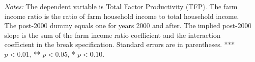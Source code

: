 \begin{table}[!htbp]
\centering
\caption{Motivating Relationship Between Agricultural Productivity and Farm Income Share}
\label{tab:regression_results}
\begin{threeparttable}
\small
{}

\begin{tablenotes}[flushleft]
\footnotesize
\item
\parbox{0.9\linewidth}{%
\textit{Notes:} The dependent variable is Total Factor Productivity (TFP). 
The farm income ratio is the ratio of farm household income to total household income. 
The post-2000 dummy equals one for years 2000 and after. 
The implied post-2000 slope is the sum of the farm income ratio coefficient and the interaction coefficient in the break specification. 
Standard errors are in parentheses. 
*** $p<0.01$, ** $p<0.05$, * $p<0.10$.}
\end{tablenotes}
\end{threeparttable}
\end{table}
